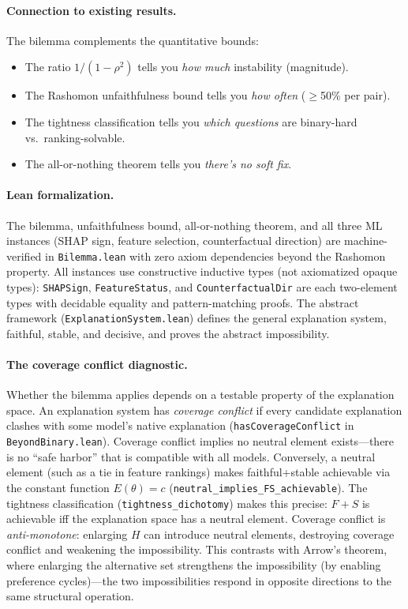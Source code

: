 \documentclass{jmlr}
\begin{document}
\paragraph{Connection to existing results.}
The bilemma complements the quantitative bounds:
\begin{itemize}
\item The ratio $1/(1{-}\rho^2)$ tells you \textit{how much} instability (magnitude).
\item The Rashomon unfaithfulness bound tells you \textit{how often} ($\geq$50\% per pair).
\item The tightness classification tells you \textit{which questions} are binary-hard vs.\ ranking-solvable.
\item The all-or-nothing theorem tells you \textit{there's no soft fix}.
\end{itemize}

\paragraph{Lean formalization.}
The bilemma, unfaithfulness bound, all-or-nothing theorem, and all three ML instances (SHAP sign, feature selection, counterfactual direction) are machine-verified in \texttt{Bilemma.lean} with zero axiom dependencies beyond the Rashomon property.
All instances use constructive inductive types (not axiomatized opaque types): \texttt{SHAPSign}, \texttt{FeatureStatus}, and \texttt{CounterfactualDir} are each two-element types with decidable equality and pattern-matching proofs.
The abstract framework (\texttt{ExplanationSystem.lean}) defines the general explanation system, faithful, stable, and decisive, and proves the abstract impossibility.

\paragraph{The coverage conflict diagnostic.}
Whether the bilemma applies depends on a testable property of the explanation space.
An explanation system has \emph{coverage conflict} if every candidate explanation clashes with some model's native explanation (\texttt{hasCoverageConflict} in \texttt{BeyondBinary.lean}).
Coverage conflict implies no neutral element exists---there is no ``safe harbor'' that is compatible with all models.
Conversely, a neutral element (such as a tie in feature rankings) makes faithful+stable achievable via the constant function $E(\theta) = c$ (\texttt{neutral\_implies\_FS\_achievable}).
The tightness classification (\texttt{tightness\_dichotomy}) makes this precise: $F{+}S$ is achievable iff the explanation space has a neutral element.
Coverage conflict is \emph{anti-monotone}: enlarging $H$ can introduce neutral elements, destroying coverage conflict and weakening the impossibility.
This contrasts with Arrow's theorem, where enlarging the alternative set strengthens the impossibility (by enabling preference cycles)---the two impossibilities respond in opposite directions to the same structural operation.
\end{document}
